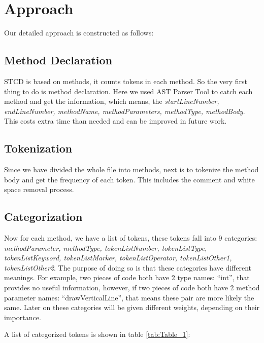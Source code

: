 \documentclass[../main.tex]{subfiles}
\begin{document}
\section{Approach}

Our detailed approach is constructed as follows:

\subsection{Method Declaration}

STCD is based on methods, it counts tokens in each method. So the very first thing to do is method declaration. Here we used AST Parser Tool to catch each method and get the information, which means, the \textit{startLineNumber, endLineNumber, methodName, methodParameters, methodType, methodBody}. This costs extra time than needed and can be improved in future work.

\subsection{Tokenization}

Since we have divided the whole file into methods, next is to tokenize the method body and get the frequency of each token. This includes the comment and white space removal process.

\subsection{Categorization}

Now for each method, we have a list of tokens, these tokens fall into 9 categories: \textit{methodParameter, methodType, tokenListNumber, tokenListType, tokenListKeyword, tokenListMarker, tokenListOperator, tokenListOther1, tokenListOther2}. The purpose of doing so is that these categories have different meanings. For example, two pieces of code both have 2 type names: ``int'', that provides no useful information, however, if two pieces of code both have 2 method parameter names: ``drawVerticalLine'', that means these pair are more likely the same. Later on these categories will be given different weights, depending on their importance.

A list of categorized tokens is shown in table \ref{tab:Table_1}:\\
\end{document}
